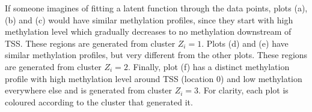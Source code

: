 If someone imagines of fitting a latent function through the data points, plots (a), (b) and (c) would have similar methylation profiles, since they start with high methylation level which gradually decreases to no methylation downstream of TSS. These regions are generated from cluster $Z_{i}=1$. Plots (d) and (e) have similar methylation profiles, but very different from the other plots. These regions are generated from cluster $Z_{i}=2$. Finally, plot (f) has a distinct methylation profile with high methylation level around TSS (\ie location 0) and low methylation everywhere else and is generated from cluster $Z_{i}=3$. For clarity, each plot is coloured according to the cluster that generated it.
 
\begin{figure}[ht!]
     \begin{center}

\end{center}
\end{figure}
